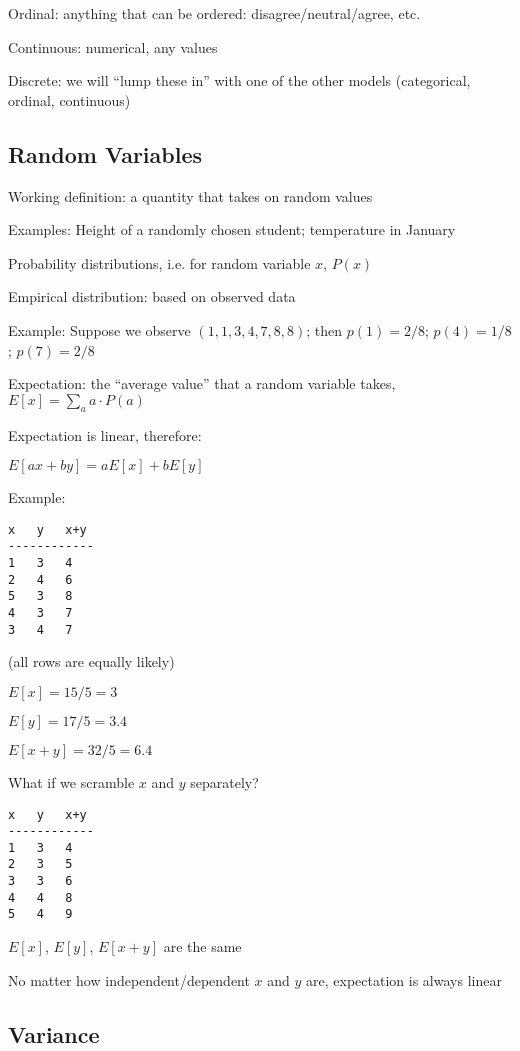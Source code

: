 \documentclass[twoside]{article}
\begin{document}
Ordinal: anything that can be ordered: disagree/neutral/agree, etc.

Continuous: numerical, any values

Discrete: we will ``lump these in'' with one of the other models (categorical, ordinal, continuous)

\subsection{Random Variables}

Working definition: a quantity that takes on random values

Examples: Height of a randomly chosen student; temperature in January

Probability distributions, i.e. for random variable $x$, $P(x)$

Empirical distribution: based on observed data

Example: Suppose we observe $(1,1,3,4,7,8,8)$; then $p(1) = 2/8$; $p(4) = 1/8$; $p(7) = 2/8$

Expectation: the ``average value'' that a random variable takes, $E[x] = \sum\limits_a a \cdot P(a)$

Expectation is linear, therefore:

$E[ax+by] = aE[x] + bE[y]$

Example: 

\begin{verbatim}
x   y   x+y
------------
1   3   4
2   4   6
5   3   8
4   3   7
3   4   7
\end{verbatim}

(all rows are equally likely)

$E[x] = 15/5 = 3$

$E[y] = 17/5 = 3.4$

$E[x+y] = 32/5 = 6.4$

What if we scramble $x$ and $y$ separately?

\begin{verbatim}
x   y   x+y
------------
1   3   4
2   3   5
3   3   6
4   4   8
5   4   9
\end{verbatim}

$E[x]$, $E[y]$, $E[x+y]$ are the same

No matter how independent/dependent $x$ and $y$ are, expectation is always linear

\subsection{Variance}
\end{document}
